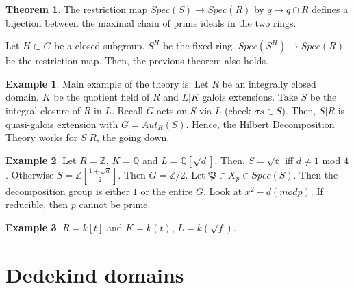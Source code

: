 \documentclass{article}
\theoremstyle{definition}
\newtheorem{theorem}{Theorem}[section]
\theoremstyle{definition}
\theoremstyle{definition}
\theoremstyle{definition}
\theoremstyle{definition}
\theoremstyle{definition}
\theoremstyle{definition}
\newtheorem{example}{Example}[section]
\begin{document}
\begin{tcolorbox}[colback=red!5!white,colframe=red!30!white]
\begin{theorem}
The restriction map $Spec(S)\to Spec(R)$ by $q\mapsto q\cap R$ defines a bijection between the maximal chain of prime ideals in the two rings. 
\end{theorem}
\end{tcolorbox}

Let $H\subset G$ be a closed subgroup. $S^H$ be the fixed ring. $Spec(S^H)\to Spec(R)$ be the restriction map. Then, the previous theorem also holds. 


\begin{tcolorbox}[colback=yellow!5!white,colframe=yellow!30!white]
\begin{example}
Main example of the theory is: Let $R$ be an integrally closed domain. $K$ be the quotient field of $R$ and $L|K$ galois extensions. Take $S$ be the integral closure of $R$ in $L$. Recall $G$ acts on $S$ via $L$ (check $\sigma s\in S$). Then, $S|R$ is quasi-galois extension with $G=Aut_R(S)$. Hence, the Hilbert Decomposition Theory works for $S|R$, the going down. 
\end{example}
\end{tcolorbox}



\begin{tcolorbox}[colback=yellow!5!white,colframe=yellow!30!white]
\begin{example}
Let $R=\mathbb{Z}$, $K=\mathbb{Q}$ and $L=\mathbb{Q}[\sqrt{d}]$. Then, $S=\mathbb{\sqrt{d}}$ iff $d\neq 1$ mod $4$. Otherwise $S=\mathbb{Z}[\frac{1+\sqrt{d}}{2}]$.
Then $G=\mathbb{Z}/2$. Let $\mathfrak{P}\in X_p\in Spec(S)$. Then the decomposition group is either $1$ or the entire $G$. Look at $x^2-d(mod p)$. If reducible, then $p$ cannot be prime.

\end{example}
\end{tcolorbox}



\begin{tcolorbox}[colback=yellow!5!white,colframe=yellow!30!white]
\begin{example}
$R=k[t]$ and $K=k(t)$, $L=k(\sqrt{f})$.
\end{example}
\end{tcolorbox}

\section{Dedekind domains}
\end{document}
